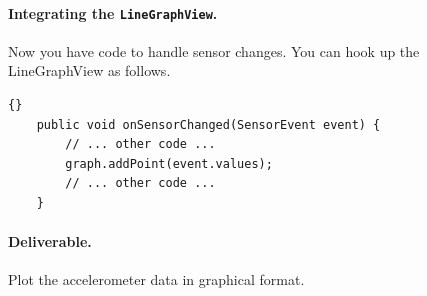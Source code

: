 \documentclass[10pt]{article}
\begin{document}
\paragraph{Integrating the {\tt LineGraphView}.} Now you have code to handle sensor changes. You can hook up the LineGraphView as follows.

\begin{lstlisting}{}
    public void onSensorChanged(SensorEvent event) {
    	// ... other code ...
        graph.addPoint(event.values);
        // ... other code ...
    }
\end{lstlisting}

\paragraph{Deliverable.} Plot the accelerometer data in graphical format.





\end{document}
